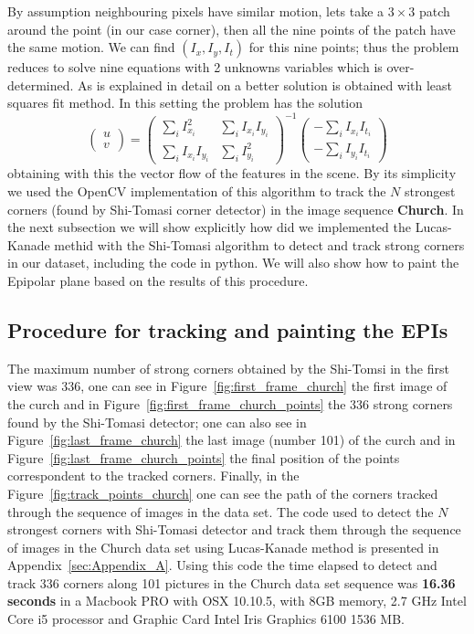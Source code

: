 \begin{itemize}
\bigskip

By assumption neighbouring pixels have similar motion, lets take a $3\times 3$ patch around the point (in our case corner), then all the nine points of the patch have the same motion. We can find $(I_x,I_y,I_t)$ for this nine points; thus the problem reduces to solve nine equations with 2 unknowns variables which is over-determined. As is explained in detail on \cite{LucasKanade} a better solution is obtained with least squares fit method. In this setting the problem has the solution
\begin{equation}
\label{eq:C2S5E13}
\left( 
\begin{matrix}
u \\
v 
\end{matrix}
\right) = 
\left(
\begin{matrix}
\sum_i I_{x_i}^2 & \sum_i I_{x_i}I_{y_i} \\
\sum_i I_{x_i}I_{y_i} & \sum_i I_{y_i}^2 
\end{matrix}
\right)^{-1}
\left(
\begin{matrix}
-\sum_i I_{x_i}I_{t_i}\\
-\sum_i I_{y_i}I_{t_i}
\end{matrix}
\right)
\end{equation}
obtaining with this the vector flow of the features in the scene. By its simplicity we used the OpenCV implementation of this algorithm to track the $N$ strongest corners (found by Shi-Tomasi corner detector) in the image sequence \textbf{Church}. In the next subsection we will show explicitly how did we implemented the Lucas-Kanade methid with the Shi-Tomasi algorithm to detect and track strong corners in our dataset, including the code in python. We will also show how to paint the Epipolar plane based on the results of this procedure. 
\end{itemize}
 
\subsection{Procedure for tracking and painting the EPIs}

The maximum number of strong corners obtained by the Shi-Tomsi in the first view was 336, one can see in Figure~\ref{fig:first_frame_church} the first image of the curch and in Figure~\ref{fig:first_frame_church_points} the 336 strong corners found by the Shi-Tomasi detector; one can also see in Figure~\ref{fig:last_frame_church} the last image (number 101) of the curch and in Figure~\ref{fig:last_frame_church_points} the final position of the points correspondent to the tracked corners. Finally, in the Figure~\ref{fig:track_points_church} one can see the path of the corners tracked through the sequence of images in the data set. The code used to detect the $N$ strongest corners with Shi-Tomasi detector and track them through the sequence of images in the Church data set using Lucas-Kanade method is presented in Appendix~\ref{sec:Appendix_A}. Using this code the time elapsed to detect and track 336 corners along 101 pictures in the Church data set sequence was \textbf{16.36 seconds} in a Macbook PRO with OSX 10.10.5, with 8GB memory, 2.7 GHz Intel Core i5 processor and Graphic Card Intel Iris Graphics 6100 1536 MB. 

